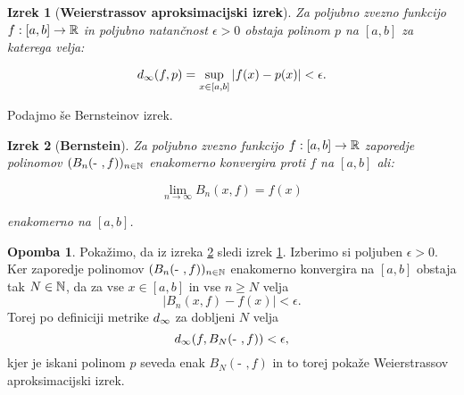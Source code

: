 \documentclass[a4paper, reqno]{amsart}
\theoremstyle{theorem}
\newtheorem{izrek}{Izrek}[section]
\theoremstyle{definition}
\newtheorem*{opomba*}{Opomba}
\begin{document}
\begin{izrek}[\textbf{Weierstrassov aproksimacijski izrek}]
	\label{Weierstrass}
	Za poljubno zvezno funkcijo $f: [a, b] \to \mathbb{R}$ in poljubno natančnost $\epsilon > 0$
	obstaja polinom $p$ na $[a,b]$ za katerega velja:

	$$ d_{\infty}(f, p) = \sup_{x \in [a, b]} |f(x)-p(x)| < \epsilon\text{.}$$
	
\end{izrek}
	
Podajmo še Bernsteinov izrek.

\begin{izrek}[\textbf{Bernstein}]
	\label{Bernsteinov izrek}
	Za poljubno zvezno funkcijo $f:[a, b] \to \mathbb{R}$ zaporedje polinomov 
	$(B_n(\text{- },f))_{n \in \mathbb{N}}$ enakomerno konvergira
	proti $f$ na $[a, b]$ ali:

	$$ \lim_{n\to\infty}B_n(x, f) = f(x)$$

	enakomerno na $[a,b]$.
\end{izrek}

\begin{opomba*}
	Pokažimo, da iz izreka \ref{Bernsteinov izrek} sledi izrek \ref{Weierstrass}.
	Izberimo si poljuben $\epsilon > 0$. Ker zaporedje polinomov 
	$(B_n(\text{- },f))_{n \in \mathbb{N}}$ enakomerno konvergira na $[a,b]$ obstaja tak 
	$N \in \mathbb{N}$, da za vse $x \in [a,b]$ in vse $n \geq N$ velja
	$$ |B_n(x,f) - f(x)| < \epsilon\text{.}$$
	Torej po definiciji metrike $d_{\infty}$ za dobljeni $N$ velja
	\begin{equation*}
		d_{\infty}(f, B_N(\text{- },f)) < \epsilon \text{,}
	\end{equation*}
	kjer je iskani polinom $p$ seveda enak $B_N(\text{- },f)$ in to torej pokaže 
	Weierstrassov aproksimacijski izrek.
\end{opomba*}
\end{document}
